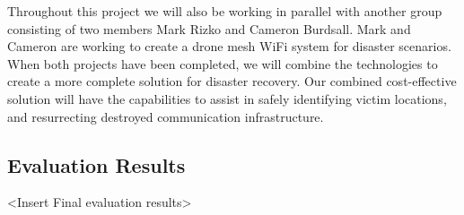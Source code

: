 Throughout this project we will also be working in parallel with another group consisting of two members Mark Rizko and Cameron Burdsall. Mark and Cameron are working to create a drone mesh WiFi system for disaster scenarios. When both projects have been completed, we will combine the technologies to create a more complete solution for disaster recovery. Our combined cost-effective solution will have the capabilities to assist in safely identifying victim locations, and resurrecting destroyed communication infrastructure.

\subsection{Evaluation Results}
    <Insert Final evaluation results>


